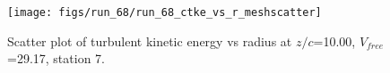 \begin{figure}[H]
\centering
\texttt{[image: figs/run\_68/run\_68\_ctke\_vs\_r\_meshscatter]}
\caption{Scatter plot of turbulent kinetic energy vs radius at $z/c$=10.00, $V_{free}$=29.17, station 7.}
\label{fig:run_68_ctke_vs_r_meshscatter}
\end{figure}


